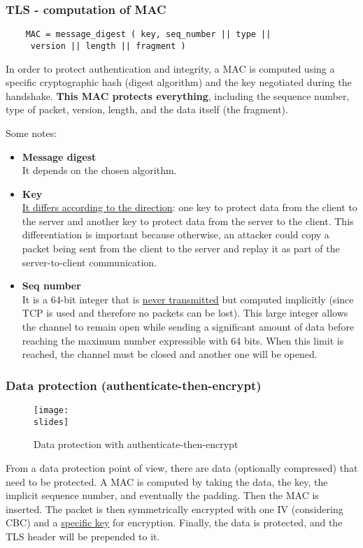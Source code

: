 \subsubsection{TLS - computation of MAC}
\begin{verbatim}
    MAC = message_digest ( key, seq_number || type ||
     version || length || fragment )
\end{verbatim}

In order to protect authentication and integrity, a MAC is computed using a specific cryptographic hash (digest algorithm) and the key negotiated during the handshake. \textbf{This MAC protects everything}, including the sequence number, type of packet, version, length, and the data itself (the fragment).

Some notes:
\begin{itemize}
    \item \textbf{Message digest} \\
          It depends on the chosen algorithm.
    \item \textbf{Key} \\
          \underline{It differs according to the direction}: one key to protect data from the client to the server and another key to protect data from the server to the client. This differentiation is important because otherwise, an attacker could copy a packet being sent from the client to the server and replay it as part of the server-to-client communication.
    \item \textbf{Seq number} \\
          It is a 64-bit integer that is \underline{never transmitted} but computed implicitly (since TCP is used and therefore no packets can be lost). This large integer allows the channel to remain open while sending a significant amount of data before reaching the maximum number expressible with 64 bits. When this limit is reached, the channel must be closed and another one will be opened.
\end{itemize}


\subsubsection{Data protection (authenticate-then-encrypt)}
\begin{figure}[h]
    \centering
    \texttt{[image: \\slides]}
    \caption{Data protection with authenticate-then-encrypt}
\end{figure}
From a data protection point of view, there are data (optionally compressed) that need to be protected. A MAC is computed by taking the data, the key, the implicit sequence number, and eventually the padding. Then the MAC is inserted. The packet is then symmetrically encrypted with one IV (considering CBC) and a \underline{specific key} for encryption. Finally, the data is protected, and the TLS header will be prepended to it.


